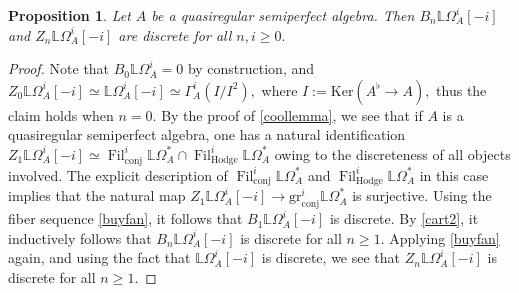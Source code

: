 \documentclass[10pt,letterpaper]{amsart}
\numberwithin{figure}{section}
\numberwithin{equation}{section}
\newtheorem{proposition}[figure]{Proposition}
\theoremstyle{definition}
\theoremstyle{definition}
\theoremstyle{definition}
\theoremstyle{definition}
\DeclareMathOperator{\conj}{conj}
\DeclareMathOperator{\Hodge}{Hodge}
\DeclareMathOperator{\Fil}{Fil}
\newcommand{\LL}{\L}
\renewcommand{\L}{\mathbb{L}}
\begin{document}
\begin{proposition}\label{prop45}
    Let $A$ be a quasiregular semiperfect algebra. Then $B_n \LL \Omega^i_A[-i]$ and $Z_n \LL \Omega_A^i[-i]$ are discrete for all $n, i \ge 0.$
\end{proposition}{}

\begin{proof}
Note that $B_0 \LL \Omega^i_A = 0$ by construction, and $Z_0 \LL \Omega^i_A [-i]\simeq \LL \Omega^i_A[-i] \simeq \Gamma^i_A (I/I^2),$ where $I := \mathrm{Ker}(A^\flat \to A),$ thus the claim holds when $n=0.$ By the proof of \cref{coollemma}, we see that if $A$ is a quasiregular semiperfect algebra, one has a natural identification $Z_1 \LL\Omega_A^i[-i] \simeq \Fil^i_{\conj} \LL \Omega^*_A \cap \Fil^i_{\Hodge} \LL \Omega^*_A$ owing to the discreteness of all objects involved. The explicit description of $\Fil^i_{\conj} \LL \Omega^*_A $ and $\Fil^i_{\Hodge} \LL \Omega^*_A$ in this case implies that the natural map $Z_1 \LL \Omega^i_A[-i] \to \mathrm{gr}^i_{\conj} \LL \Omega^*_A$ is surjective. Using the fiber sequence \cref{buyfan}, it follows that $B_1 \LL \Omega^i_A[-i]$ is discrete. By \cref{cart2}, it inductively follows that $B_n \LL \Omega^i_A[-i]$ is discrete for all $n \ge 1.$ Applying \cref{buyfan} again, and using the fact that $\LL \Omega^i_A [-i] $ is discrete, we see that $Z_n \LL \Omega^i_A[-i]$ is discrete for all $n \ge 1.$
\end{proof}{}



\end{document}

